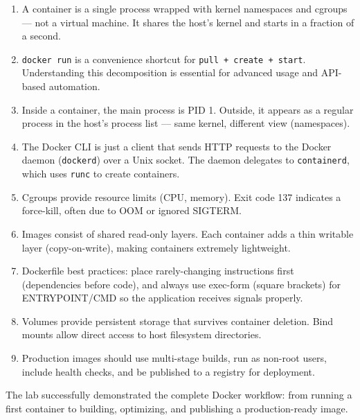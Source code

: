 \documentclass[12pt, a4paper]{article}
\begin{document}
\begin{enumerate}[nosep]
    \item A container is a single process wrapped with kernel namespaces and cgroups --- not a virtual machine. It shares the host's kernel and starts in a fraction of a second.

    \item \texttt{docker run} is a convenience shortcut for \texttt{pull + create + start}. Understanding this decomposition is essential for advanced usage and API-based automation.

    \item Inside a container, the main process is PID 1. Outside, it appears as a regular process in the host's process list --- same kernel, different view (namespaces).

    \item The Docker CLI is just a client that sends HTTP requests to the Docker daemon (\texttt{dockerd}) over a Unix socket. The daemon delegates to \texttt{containerd}, which uses \texttt{runc} to create containers.

    \item Cgroups provide resource limits (CPU, memory). Exit code 137 indicates a force-kill, often due to OOM or ignored SIGTERM.

    \item Images consist of shared read-only layers. Each container adds a thin writable layer (copy-on-write), making containers extremely lightweight.

    \item Dockerfile best practices: place rarely-changing instructions first (dependencies before code), and always use exec-form (square brackets) for ENTRYPOINT/CMD so the application receives signals properly.

    \item Volumes provide persistent storage that survives container deletion. Bind mounts allow direct access to host filesystem directories.

    \item Production images should use multi-stage builds, run as non-root users, include health checks, and be published to a registry for deployment.
\end{enumerate}

The lab successfully demonstrated the complete Docker workflow: from running a first container to building, optimizing, and publishing a production-ready image.
\end{document}
